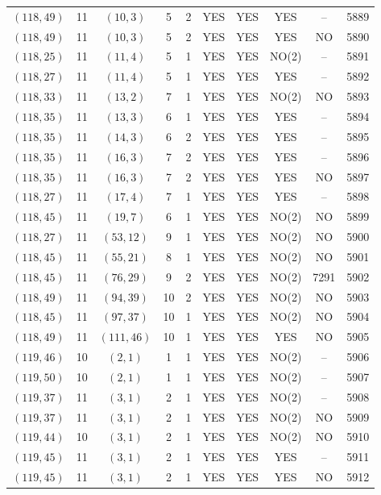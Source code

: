 \begin{longtable}{|c|c|c|c|c|c|c|c|c|c|}
$(118, 49)$ & 11 & $(10, 3)$ & 5 & 2 & YES & YES & YES & -- & 5889\\
$(118, 49)$ & 11 & $(10, 3)$ & 5 & 2 & YES & YES & YES & NO & 5890\\
$(118, 25)$ & 11 & $(11, 4)$ & 5 & 1 & YES & YES & NO(2) & -- & 5891\\
$(118, 27)$ & 11 & $(11, 4)$ & 5 & 1 & YES & YES & YES & -- & 5892\\
$(118, 33)$ & 11 & $(13, 2)$ & 7 & 1 & YES & YES & NO(2) & NO & 5893\\
$(118, 35)$ & 11 & $(13, 3)$ & 6 & 1 & YES & YES & YES & -- & 5894\\
$(118, 35)$ & 11 & $(14, 3)$ & 6 & 2 & YES & YES & YES & -- & 5895\\
$(118, 35)$ & 11 & $(16, 3)$ & 7 & 2 & YES & YES & YES & -- & 5896\\
$(118, 35)$ & 11 & $(16, 3)$ & 7 & 2 & YES & YES & YES & NO & 5897\\
$(118, 27)$ & 11 & $(17, 4)$ & 7 & 1 & YES & YES & YES & -- & 5898\\
$(118, 45)$ & 11 & $(19, 7)$ & 6 & 1 & YES & YES & NO(2) & NO & 5899\\
$(118, 27)$ & 11 & $(53, 12)$ & 9 & 1 & YES & YES & NO(2) & NO & 5900\\
$(118, 45)$ & 11 & $(55, 21)$ & 8 & 1 & YES & YES & NO(2) & NO & 5901\\
$(118, 45)$ & 11 & $(76, 29)$ & 9 & 2 & YES & YES & NO(2) & 7291 & 5902\\
$(118, 49)$ & 11 & $(94, 39)$ & 10 & 2 & YES & YES & NO(2) & NO & 5903\\
$(118, 45)$ & 11 & $(97, 37)$ & 10 & 1 & YES & YES & NO(2) & NO & 5904\\
$(118, 49)$ & 11 & $(111, 46)$ & 10 & 1 & YES & YES & YES & NO & 5905\\
$(119, 46)$ & 10 & $(2, 1)$ & 1 & 1 & YES & YES & NO(2) & -- & 5906\\
$(119, 50)$ & 10 & $(2, 1)$ & 1 & 1 & YES & YES & NO(2) & -- & 5907\\
$(119, 37)$ & 11 & $(3, 1)$ & 2 & 1 & YES & YES & NO(2) & -- & 5908\\
$(119, 37)$ & 11 & $(3, 1)$ & 2 & 1 & YES & YES & NO(2) & NO & 5909\\
$(119, 44)$ & 10 & $(3, 1)$ & 2 & 1 & YES & YES & NO(2) & NO & 5910\\
$(119, 45)$ & 11 & $(3, 1)$ & 2 & 1 & YES & YES & YES & -- & 5911\\
$(119, 45)$ & 11 & $(3, 1)$ & 2 & 1 & YES & YES & YES & NO & 5912\\

\end{longtable}
